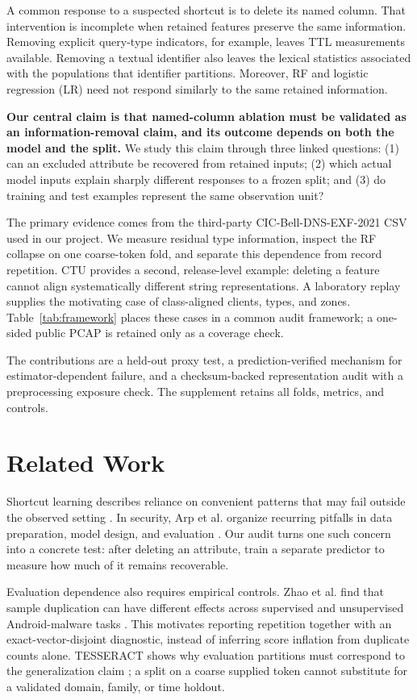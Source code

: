 \documentclass[conference]{IEEEtran}
\begin{document}
A common response to a suspected shortcut is to delete its named column. That intervention is incomplete when retained features preserve the same information. Removing explicit query-type indicators, for example, leaves TTL measurements available. Removing a textual identifier also leaves the lexical statistics associated with the populations that identifier partitions. Moreover, RF and logistic regression (LR) need not respond similarly to the same retained information.

\textbf{Our central claim is that named-column ablation must be validated as an information-removal claim, and its outcome depends on both the model and the split.} We study this claim through three linked questions: (1) can an excluded attribute be recovered from retained inputs; (2) which actual model inputs explain sharply different responses to a frozen split; and (3) do training and test examples represent the same observation unit?

The primary evidence comes from the third-party CIC-Bell-DNS-EXF-2021 CSV used in our project. We measure residual type information, inspect the RF collapse on one coarse-token fold, and separate this dependence from record repetition. CTU provides a second, release-level example: deleting a feature cannot align systematically different string representations. A laboratory replay supplies the motivating case of class-aligned clients, types, and zones. Table~\ref{tab:framework} places these cases in a common audit framework; a one-sided public PCAP is retained only as a coverage check.

The contributions are a held-out proxy test, a prediction-verified mechanism for estimator-dependent failure, and a checksum-backed representation audit with a preprocessing exposure check. The supplement retains all folds, metrics, and controls.

\section{Related Work}
Shortcut learning describes reliance on convenient patterns that may fail outside the observed setting \cite{geirhos}. In security, Arp et al. organize recurring pitfalls in data preparation, model design, and evaluation \cite{arp}. Our audit turns one such concern into a concrete test: after deleting an attribute, train a separate predictor to measure how much of it remains recoverable.

Evaluation dependence also requires empirical controls. Zhao et al. find that sample duplication can have different effects across supervised and unsupervised Android-malware tasks \cite{zhao}. This motivates reporting repetition together with an exact-vector-disjoint diagnostic, instead of inferring score inflation from duplicate counts alone. TESSERACT shows why evaluation partitions must correspond to the generalization claim \cite{tesseract}; a split on a coarse supplied token cannot substitute for a validated domain, family, or time holdout.
\end{document}
